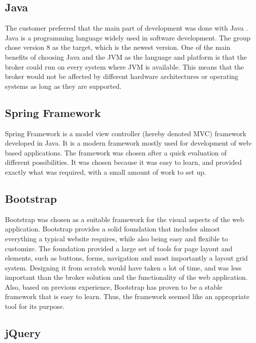 \subsection{Java}
\label{subsec:prestudies-tools-java}

The customer preferred that the main part of development was done with Java \cite{java}. Java is a programming language widely used in software development. The group chose version 8 as the target, which is the newest version. One of the main benefits of choosing Java and the JVM as the language and platform is that the broker could run on every system where JVM is available. This means that the broker would not be affected by different hardware architectures or operating systems as long as they are supported.

\subsection{Spring Framework}
\label{subsec:prestudies-tools-spring_mvc}

Spring Framework \cite{spring-framework} is a model view controller (hereby denoted MVC) framework developed in Java. It is a modern framework mostly used for development of web-based applications. The framework was chosen after a quick evaluation of different possibilities. It was chosen because it was easy to learn, and provided exactly what was required, with a small amount of work to set up.

\subsection{Bootstrap}
\label{subsec:prestudies-tools-bootstrap}

Bootstrap \cite{bootstrap} was chosen as a suitable framework for the visual aspects of the web application. Bootstrap provides a solid foundation that includes almost everything a typical website requires, while also being easy and flexible to customize. The foundation provided a large set of tools for page layout and elements, such as buttons, forms, navigation and most importantly a layout grid system. Designing it from scratch would have taken a lot of time, and was less important than the broker solution and the functionality of the web application. Also, based on previous experience, Bootstrap has proven to be a stable framework that is easy to learn. Thus, the framework seemed like an appropriate tool for its purpose.

\subsection{jQuery}
\label{subsec:prestudies-tools-jQuery}

